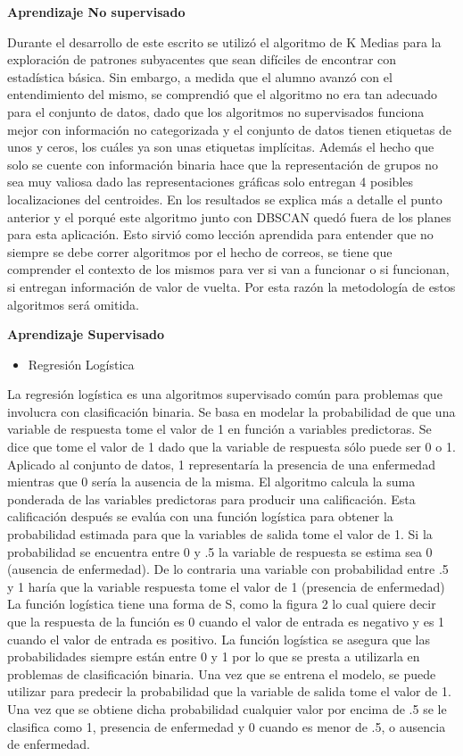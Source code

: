 \documentclass[twocolumn]{bmcart}%
\begin{document}
\textbf{Aprendizaje No supervisado}

Durante el desarrollo de este escrito se utilizó el algoritmo de K Medias para la exploración de patrones subyacentes que sean difíciles de encontrar con estadística básica. Sin embargo, a medida que el alumno avanzó con el entendimiento del mismo, se comprendió que el algoritmo no era tan adecuado para el conjunto de datos, dado que los algoritmos no supervisados funciona mejor con información no categorizada y el conjunto de datos tienen etiquetas de unos y ceros, los cuáles ya son unas etiquetas implícitas. Además el hecho que solo se cuente con información binaria hace que la representación de grupos no sea muy valiosa dado las representaciones gráficas solo entregan 4 posibles localizaciones del centroides. En los resultados se explica más a detalle el punto anterior y el porqué este algoritmo junto con DBSCAN quedó fuera de los planes para esta aplicación. Esto sirvió como lección aprendida para entender que no siempre se debe correr algoritmos por el hecho de correos, se tiene que comprender el contexto de los mismos para ver si van a funcionar o si funcionan, si entregan información de valor de vuelta. Por esta razón la metodología de estos algoritmos será omitida. 


\textbf{Aprendizaje Supervisado}

\begin{itemize}
    \item Regresión Logística 
\end{itemize}

La regresión logística es una algoritmos supervisado común para problemas que involucra con clasificación binaria. Se basa en modelar la probabilidad de que una variable de respuesta tome el valor de 1 en función a variables predictoras. Se dice que tome el valor de 1 dado que la variable de respuesta sólo puede ser 0 o 1. Aplicado al conjunto  de datos, 1 representaría la presencia de una enfermedad mientras que 0 sería la ausencia de la misma.
El algoritmo calcula la suma ponderada de las variables predictoras para producir una calificación. Esta calificación después se evalúa con una función logística para obtener la probabilidad estimada para que la variables de salida tome el valor de 1. Si la probabilidad se encuentra entre 0 y .5 la variable de respuesta se estima sea 0 (ausencia de enfermedad). De lo contraria una variable con probabilidad entre .5 y 1 haría que la variable respuesta tome el valor de 1 (presencia de enfermedad)
La función logística tiene una forma de S, como la figura 2 lo cual quiere decir que la respuesta de la función es 0 cuando el valor de entrada es negativo y es 1 cuando el valor de entrada es positivo. La función logística se asegura que las probabilidades siempre están entre 0 y 1 por lo que se presta a utilizarla en problemas de clasificación binaria.
Una vez que se entrena el modelo, se puede utilizar para predecir la probabilidad que la variable de salida tome el valor de 1. Una vez que se obtiene dicha probabilidad cualquier valor por encima de .5 se le clasifica como 1, presencia de enfermedad y 0 cuando es menor de .5, o ausencia de enfermedad. \cite{SQ3}
\end{document}
